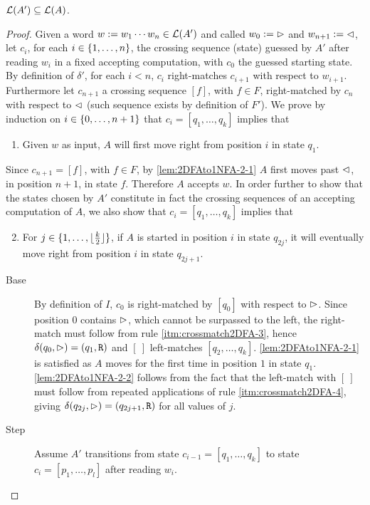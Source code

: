 \begin{lemm}\label{lem:2DFAto1NFA-2}
	$\mathcal L(A')\subseteq\mathcal L(A)$.
\end{lemm}
\begin{proof}
	Given a word $w:=w_1\cdots w_n\in\mathcal L(A')$ and called $w_0:=\rhd$ and $w_{n+1}:=\lhd$, let $c_i$, for each $i\in\{1,\dots,n\}$, the crossing sequence (state) guessed by $A'$ after reading $w_i$ in a fixed accepting computation, with $c_0$ the guessed starting state.
	By definition of $\delta'$, for each $i<n$, $c_i$ right-matches $c_{i+1}$ with respect to $w_{i+1}$.
	Furthermore let $c_{n+1}$ a crossing sequence $[f]$, with $f\in F$, right-matched by $c_n$ with respect to $\lhd$ (such sequence exists by definition of $F'$).
	We prove by induction on $i\in\{0,\dots,n+1\}$ that $c_i=[q_1,\dots,q_k]$ implies that
	\begin{enumerate}[(1)]
		\item \label{lem:2DFAto1NFA-2-1} Given $w$ as input, $A$ will first move right from position $i$ in state $q_1$.
	\end{enumerate}
	Since $c_{n+1}=[f]$, with $f\in F$, by \ref{lem:2DFAto1NFA-2-1} $A$ first moves past $\lhd$, in position $n+1$, in state $f$. Therefore $A$ accepts $w$.
	In order further to show that the states chosen by $A'$ constitute in fact the crossing sequences of an accepting computation of $A$, we also show that $c_i=[q_1,\dots,q_k]$ implies that
	\begin{enumerate}[(1)]
		\setcounter{enumi}{1}
		\item \label{lem:2DFAto1NFA-2-2} For $j\in\{1,\dots,\lfloor \frac{k}{2} \rfloor\}$, if $A$ is started in position $i$ in state $q_{2j}$, it will eventually move right from position $i$ in state $q_{2j+1}$.
	\end{enumerate}
	\begin{description}
		\item[Base] By definition of $I$, $c_0$ is right-matched by $[q_0]$ with respect to $\rhd$. Since position $0$ contains $\rhd$, which cannot be surpassed to the left, the right-match must follow from rule \ref{itm:crossmatch2DFA-3}, hence $\delta(q_0,\rhd)=(q_1,\mathtt R)$ and $[~]$ left-matches $[q_2,\dots,q_k]$.
			\ref{lem:2DFAto1NFA-2-1} is satisfied as $A$ moves for the first time in position $1$ in state $q_1$.
			\ref{lem:2DFAto1NFA-2-2} follows from the fact that the left-match with $[~]$ must follow from repeated applications of rule \ref{itm:crossmatch2DFA-4}, giving $\delta(q_{2j},\rhd)=(q_{2j+1},\mathtt R)$ for all values of $j$.
		\item[Step] Assume $A'$ transitions from state $c_{i-1}=[q_1,\dots,q_k]$ to state $c_i=[p_1,\dots,p_l]$ after reading $w_i$.

\end{description}
\end{proof}
